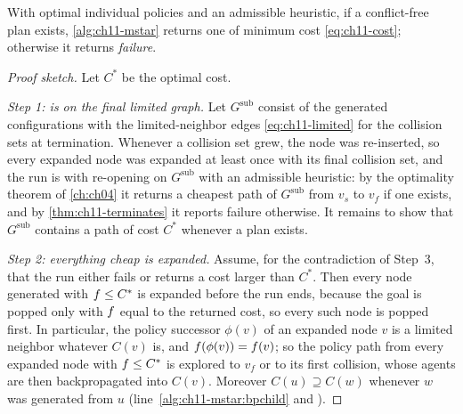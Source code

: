 \begin{theorem}
\label{thm:ch11-optimal}
With optimal individual policies and an admissible heuristic, if a
conflict-free plan exists, \cref{alg:ch11-mstar} returns one of minimum
cost \cref{eq:ch11-cost}; otherwise it returns \emph{failure}.
\end{theorem}
\begin{proof}[Proof sketch]
Let $C^*$ be the optimal cost.

\emph{Step 1: \mstar is \astar on the final limited graph.} Let
$G^{\mathrm{sub}}$ consist of the generated configurations with the
limited-neighbor edges \cref{eq:ch11-limited} for the collision sets at
termination. Whenever a collision set grew, the node was re-inserted, so
every expanded node was expanded at least once with its final collision
set, and the run is \astar with re-opening on $G^{\mathrm{sub}}$ with an
admissible heuristic: by the optimality theorem of \cref{ch:ch04} it
returns a cheapest path of $G^{\mathrm{sub}}$ from $v_s$ to $v_f$ if one
exists, and by \cref{thm:ch11-terminates} it reports failure otherwise. It
remains to show that $G^{\mathrm{sub}}$ contains a path of cost $C^*$
whenever a plan exists.

\emph{Step 2: everything cheap is expanded.} Assume, for the contradiction
of Step~3, that the run either fails or returns a cost larger than $C^*$.
Then every node generated with $f \le C^*$ is expanded before the run
ends, because the goal is popped only with $f$ equal to the returned
cost, so every such node is popped first. In particular, the policy successor $\phi(v)$ of an expanded
node $v$ is a limited neighbor whatever $C(v)$ is, and $f(\phi(v)) =
f(v)$; so the policy path from every expanded node with $f \le
C^*$ is explored to $v_f$ or to its first collision, whose agents are then
backpropagated into $C(v)$. Moreover $C(u) \supseteq C(w)$ whenever $w$ was
generated from $u$ (line~\ref{alg:ch11-mstar:bpchild} and \MstarBackprop).


\end{proof}
